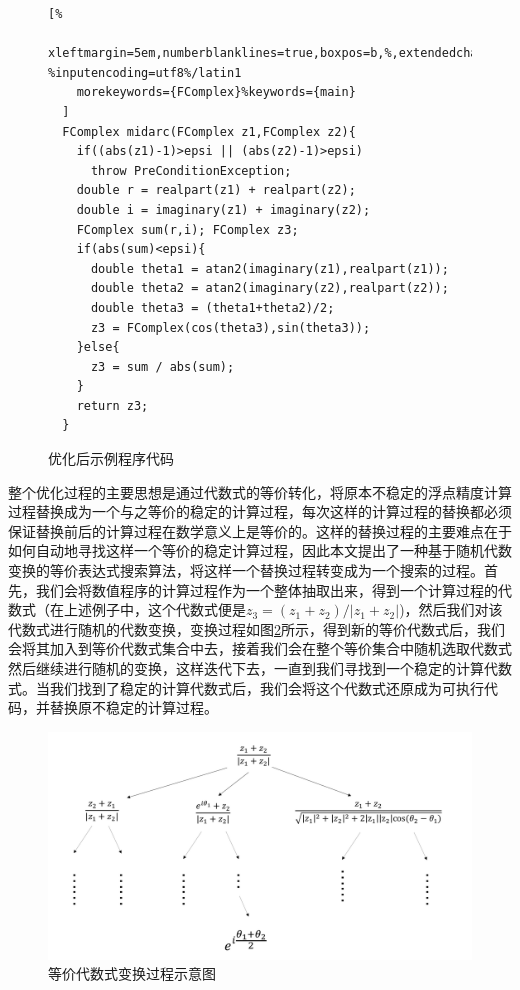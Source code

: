 \begin{figure}[thbp]
  \begin{lstlisting}[%
    xleftmargin=5em,numberblanklines=true,boxpos=b,%,extendedchars=\true, %inputencoding=utf8%/latin1
    morekeywords={FComplex}%keywords={main}
  ]
  FComplex midarc(FComplex z1,FComplex z2){
    if((abs(z1)-1)>epsi || (abs(z2)-1)>epsi)
      throw PreConditionException;
    double r = realpart(z1) + realpart(z2);      
    double i = imaginary(z1) + imaginary(z2);    
    FComplex sum(r,i); FComplex z3;              
    if(abs(sum)<epsi){
      double theta1 = atan2(imaginary(z1),realpart(z1));
      double theta2 = atan2(imaginary(z2),realpart(z2));
      double theta3 = (theta1+theta2)/2;
      z3 = FComplex(cos(theta3),sin(theta3));
    }else{
      z3 = sum / abs(sum);                       
    }
    return z3;
  }
  \end{lstlisting}
  \caption{优化后示例程序代码}
  \label{lst:exoptcode}
\end{figure}

整个优化过程的主要思想是通过代数式的等价转化，将原本不稳定的浮点精度计算过程替换成为一个与之等价的稳定的计算过程，每次这样的计算过程的替换都必须保证替换前后的计算过程在数学意义上是等价的。这样的替换过程的主要难点在于如何自动地寻找这样一个等价的稳定计算过程，因此本文提出了一种基于随机代数变换的等价表达式搜索算法，将这样一个替换过程转变成为一个搜索的过程。首先，我们会将数值程序的计算过程作为一个整体抽取出来，得到一个计算过程的代数式（在上述例子中，这个代数式便是$z_3=(z_1+z_2)/|z_1+z_2|$)，然后我们对该代数式进行随机的代数变换，变换过程如图\ref{fig:eqspace}所示，得到新的等价代数式后，我们会将其加入到等价代数式集合中去，接着我们会在整个等价集合中随机选取代数式然后继续进行随机的变换，这样迭代下去，一直到我们寻找到一个稳定的计算代数式。当我们找到了稳定的计算代数式后，我们会将这个代数式还原成为可执行代码，并替换原不稳定的计算过程。

\begin{figure}[thb]
  \centering
  \vspace*{1mm}
  \includegraphics[width=\columnwidth]{fig/EquivalentSpace.png}
  \vspace*{1mm}
  \caption{等价代数式变换过程示意图} \label{fig:eqspace} %
\end{figure}

